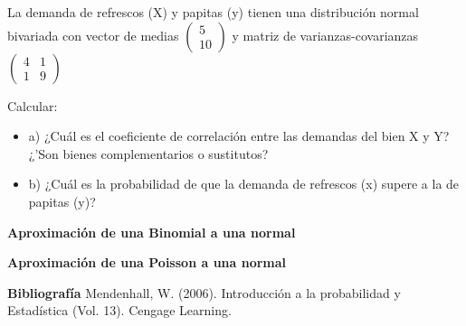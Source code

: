 \documentclass{oxmathproblems}
\begin{document}
\begin{questions}
\miquestion La demanda de refrescos (X) y papitas (y) tienen una distribución normal bivariada con vector de medias $\begin{pmatrix}5 \\ 10 \end{pmatrix} $  y matriz de varianzas-covarianzas $\begin{pmatrix}4 & 1\\ 1 &9\end{pmatrix} $

Calcular:  
\begin{itemize}
\item  a) ¿Cuál es el coeficiente de correlación entre las demandas del bien X y Y? ¿'Son bienes complementarios o sustitutos?
\item  b) ¿Cuál es la probabilidad de que la demanda de refrescos (x) supere a la de papitas (y)?
\end{itemize}

\miquestion \textbf {Aproximación de una Binomial a una normal}


\miquestion \textbf {Aproximación de una Poisson a una normal}


\end{questions}

\textbf{Bibliografía}
Mendenhall, W. (2006). Introducción a la probabilidad y Estadística (Vol. 13). Cengage Learning.
\end{document}
